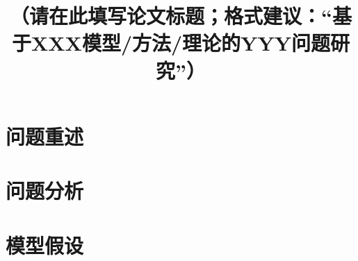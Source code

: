 \documentclass[withoutpreface,bwprint]{cumcmthesis} %
\title{（请在此填写论文标题；格式建议：“基于XXX模型/方法/理论的YYY问题研究”）}
\begin{document}
\maketitle

\begin{abstract}
%

\end{abstract}



\section{问题重述}
%

\section{问题分析}
%

\section{模型假设}
%
\end{document}
